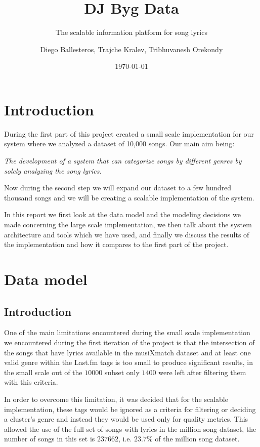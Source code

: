 \documentclass[11pt,a4paper]{scrartcl}
\author{Diego Ballesteros, Trajche Kralev, Tribhuvanesh Orekondy}
\title{DJ Byg Data}
\subtitle{The scalable information platform for song lyrics}
\date{\today}
\begin{document}
  \maketitle
  \section{Introduction}

	  During the first part of this project created a small scale implementation
	  for our system where we analyzed a dataset of 10,000 songs. Our main aim
	  being:
	  
	  \emph{The development of a system that can categorize songs by different
	  genres by solely analyzing the song lyrics.}
	
	  Now during the second step we will expand our dataset to a few hundred thousand
	  songs and we will be creating a scalable implementation of the system.

		In this report we first look at the data model and the modeling decisions
		we made concerning the large scale implementation, we then talk about the
   	system architecture and tools which we have used, and finally we discuss the
   	results of the implementation and how it compares to the first part of the
   	project.

  \section{Data model}
    \subsection{Introduction}

    One of the main limitations encountered during the small scale implementation
    we encountered during the first iteration of the project is that the
    intersection of the songs that have lyrics available in the musiXmatch
    dataset and at least one valid genre within the Last.fm tags is too small to
    produce significant results, in the small scale out of the $10000$ subset only
    $1400$ were left after filtering them with this criteria.
    
    In order to overcome this limitation, it was decided that for the scalable
    implementation, these tags would be ignored as a criteria for filtering or
    deciding a cluster's genre and instead they would be used only for quality
    metrics. This allowed the use of the full set of songs with lyrics in the
    million song dataset, the number of songs in this set is $237662$, i.e. 
    $23.7\%$ of the million song dataset.
    
\end{document}
